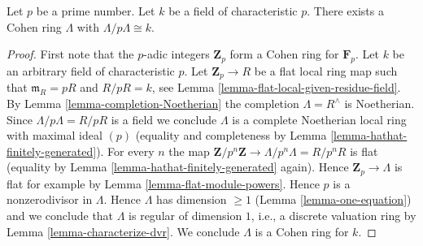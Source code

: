\begin{lemma}
\label{lemma-cohen-rings-exist}
Let $p$ be a prime number.
Let $k$ be a field of characteristic $p$.
There exists a Cohen ring $\Lambda$ with $\Lambda/p\Lambda \cong k$.
\end{lemma}

\begin{proof}
First note that the $p$-adic integers $\mathbf{Z}_p$ form a Cohen ring
for $\mathbf{F}_p$. Let $k$ be an arbitrary field of characteristic $p$.
Let $\mathbf{Z}_p \to R$ be a flat local ring map such that
$\mathfrak m_R = pR$ and $R/pR = k$, see
Lemma \ref{lemma-flat-local-given-residue-field}.
By Lemma \ref{lemma-completion-Noetherian} the completion
$\Lambda = R^\wedge$ is Noetherian. Since $\Lambda/p\Lambda = R/pR$
is a field we conclude $\Lambda$ is a
complete Noetherian local ring with maximal ideal $(p)$
(equality and completeness by Lemma \ref{lemma-hathat-finitely-generated}).
For every $n$ the map $\mathbf{Z}/p^n\mathbf{Z} \to \Lambda/p^n\Lambda = R/p^nR$
is flat (equality by Lemma \ref{lemma-hathat-finitely-generated} again).
Hence $\mathbf{Z}_p \to \Lambda$ is flat for example by
Lemma \ref{lemma-flat-module-powers}. Hence $p$ is a
nonzerodivisor in $\Lambda$. Hence $\Lambda$ has dimension $\geq 1$
(Lemma \ref{lemma-one-equation})
and we conclude that $\Lambda$ is regular of dimension $1$, i.e.,
a discrete valuation ring by Lemma \ref{lemma-characterize-dvr}.
We conclude $\Lambda$ is a Cohen ring for $k$.
\end{proof}